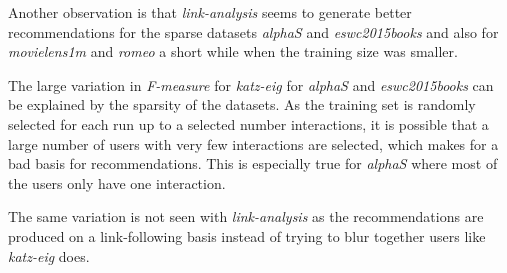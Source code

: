 Another observation is that \textit{link-analysis} seems to generate better recommendations for the sparse datasets \textit{alphaS} and \textit{eswc2015books} and also for \textit{movielens1m} and \textit{romeo} a short while when the training size was smaller.

The large variation in \textit{F-measure} for \textit{katz-eig} for \textit{alphaS} and \textit{eswc2015books} can be explained by the sparsity of the datasets. As the training set is randomly selected for each run up to a selected number interactions, it is possible that a large number of users with very few interactions are selected, which makes for a bad basis for recommendations. This is especially true for \textit{alphaS} where most of the users only have one interaction.

The same variation is not seen with \textit{link-analysis} as the recommendations are produced on a link-following basis instead of trying to blur together users like \textit{katz-eig} does.

\FloatBarrier

